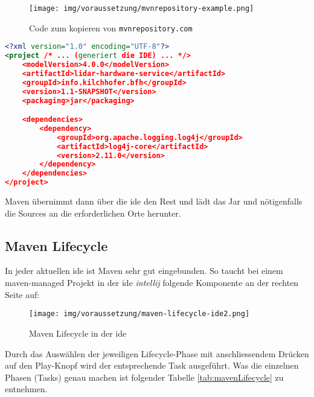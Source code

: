 \begin{figure}[H]
	\centering
	\texttt{[image: img/voraussetzung/mvnrepository-example.png]}
	\caption{Code zum kopieren von \texttt{mvnrepository.com}}
	\label{fig:mvnrepository-example}
\end{figure}

\begin{lstlisting}[language=XML, caption={Simples Beispiel wie ein pom.xml aussieht},label={lst:maven-example-simple}]
<?xml version="1.0" encoding="UTF-8"?>
<project /* ... (generiert die IDE) ... */>
	<modelVersion>4.0.0</modelVersion>
	<artifactId>lidar-hardware-service</artifactId>
	<groupId>info.kilchhofer.bfh</groupId>
	<version>1.1-SNAPSHOT</version>
	<packaging>jar</packaging>

	<dependencies>
		<dependency>
			<groupId>org.apache.logging.log4j</groupId>
			<artifactId>log4j-core</artifactId>
			<version>2.11.0</version>
		</dependency>
	</dependencies>
</project>
\end{lstlisting}
Maven übernimmt dann über die \acrshort{ide} den Rest und lädt das Jar und nötigenfalls die Sources an die erforderlichen Orte herunter.
\subsection{Maven Lifecycle}
In jeder aktuellen \acrshort{ide} ist Maven sehr gut eingebunden. So taucht bei einem maven-managed Projekt in der \acrshort{ide} \textit{\Gls{intellij}} folgende Komponente an der rechten Seite auf:
\begin{figure}[H]
	\centering
	\texttt{[image: img/voraussetzung/maven-lifecycle-ide2.png]}
	\caption{Maven Lifecycle in der \acrshort{ide}}
	\label{fig:maven-ide}
\end{figure}
Durch das Auswählen der jeweiligen Lifecycle-Phase mit anschliessendem Drücken auf den Play-Knopf wird der entsprechende Task ausgeführt. Was die einzelnen Phasen (Tasks) genau machen ist folgender Tabelle \ref{tab:mavenLifecycle} zu entnehmen.

